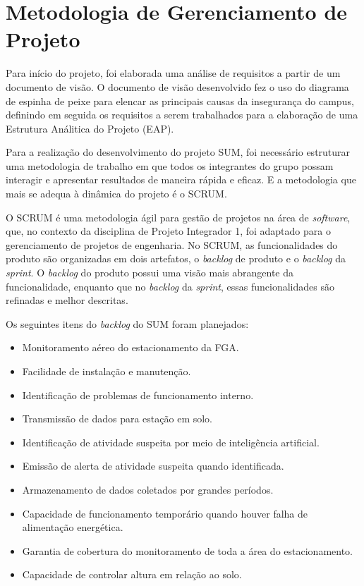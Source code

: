 \section{Metodologia de Gerenciamento de Projeto} %

  Para início do projeto, foi elaborada uma análise de requisitos a partir de um documento de visão. O documento de visão desenvolvido fez o uso do diagrama de espinha de peixe para elencar as principais causas da insegurança do campus, definindo em seguida os requisitos a serem trabalhados para a elaboração de uma Estrutura Análitica do Projeto (EAP).

  Para a realização do desenvolvimento do projeto SUM, foi necessário estruturar uma metodologia de trabalho em que todos os integrantes do grupo possam interagir e apresentar resultados de maneira rápida e eficaz. E a metodologia que mais se adequa à dinâmica do projeto é o SCRUM.

  O SCRUM é uma metodologia ágil para gestão de projetos na área de \emph{software}, que, no contexto da disciplina de Projeto Integrador 1, foi adaptado para o gerenciamento de projetos de engenharia.
  No SCRUM, as funcionalidades do produto são organizadas em dois artefatos, o \emph{backlog} de produto e o \emph{backlog} da \emph{sprint}. O \emph{backlog} do produto possui uma visão mais abrangente da funcionalidade, enquanto que no \emph{backlog} da \emph{sprint}, essas funcionalidades são refinadas e melhor descritas.

  Os seguintes itens do \emph{backlog} do SUM foram planejados:

  \begin{itemize}
    \item Monitoramento aéreo do estacionamento da FGA.
    \item Facilidade de instalação e manutenção.
    \item Identificação de problemas de funcionamento interno.
    \item Transmissão de dados para estação em solo.
    \item Identificação de atividade suspeita por meio de inteligência artificial.
    \item Emissão de alerta de atividade suspeita quando identificada.
    \item Armazenamento de dados coletados por grandes períodos.
    \item Capacidade de funcionamento temporário quando houver falha de alimentação  energética.
    \item Garantia de cobertura do monitoramento de toda a área do estacionamento.
    \item Capacidade de controlar altura em relação ao solo.
\end{itemize}

